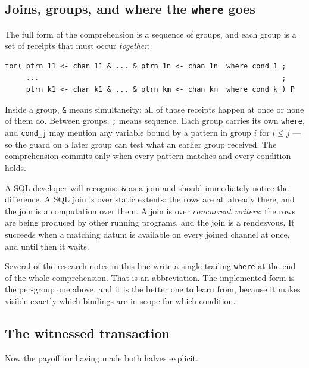 \subsection{Joins, groups, and where the \texttt{where} goes}

The full form of the comprehension is a sequence of groups, and each group is a
set of receipts that must occur \emph{together}:

\begin{lstlisting}
for( ptrn_11 <- chan_11 & ... & ptrn_1n <- chan_1n  where cond_1 ;
     ...                                                         ;
     ptrn_k1 <- chan_k1 & ... & ptrn_km <- chan_km  where cond_k ) P
\end{lstlisting}

Inside a group, \texttt{\&} means simultaneity: all of those receipts happen at
once or none of them do. Between groups, \texttt{;} means sequence. Each group
carries its own \texttt{where}, and \texttt{cond\_j} may mention any variable
bound by a pattern in group $i$ for $i \leq j$ --- so the guard on a later group
can test what an earlier group received. The comprehension commits only when
every pattern matches and every condition holds.

A SQL developer will recognise \texttt{\&} as a join and should immediately
notice the difference. A SQL join is over static extents: the rows are all
already there, and the join is a computation over them. A \flang{} join is over
\emph{concurrent writers}: the rows are being produced by other running
programs, and the join is a rendezvous. It succeeds when a matching datum is
available on every joined channel at once, and until then it waits.

\begin{aside}
Several of the research notes in this line write a single trailing
\texttt{where} at the end of the whole comprehension. That is an abbreviation.
The implemented form is the per-group one above, and it is the better one to
learn from, because it makes visible exactly which bindings are in scope for
which condition.
\end{aside}

\subsection{The witnessed transaction}
\label{sec:transaction}

Now the payoff for having made both halves explicit.


